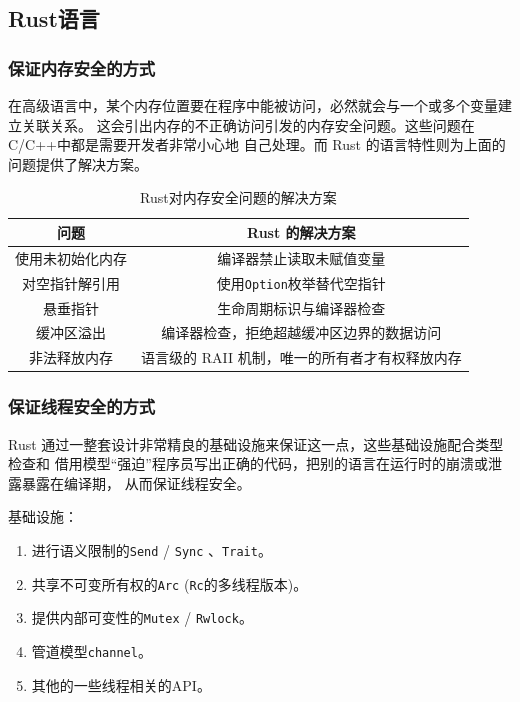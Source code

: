 \documentclass{../runikraft-report}
\begin{document}
\subsection{Rust语言}\vspace*{-4ex}
\subsubsection{保证内存安全的方式}
在高级语言中，某个内存位置要在程序中能被访问，必然就会与一个或多个变量建立关联关系。
这会引出内存的不正确访问引发的内存安全问题。这些问题在C/C++中都是需要开发者非常小心地
自己处理。而 Rust 的语言特性则为上面的问题提供了解决方案。\cite{bib:feasibility-8}
\begin{table}[H]
\centering
\caption{Rust对内存安全问题的解决方案}
\begin{tabular}{|c|c|}
\hline
\textbf{问题} & \textbf{Rust 的解决方案}\\\hline
使用未初始化内存&编译器禁止读取未赋值变量\\\hline
对空指针解引用&使用\texttt{Option}枚举替代空指针\\\hline
悬垂指针&生命周期标识与编译器检查\\\hline
缓冲区溢出&编译器检查，拒绝超越缓冲区边界的数据访问\\\hline
非法释放内存&语言级的 RAII 机制，唯一的所有者才有权释放内存\\\hline
\end{tabular}
\end{table}
\subsubsection{保证线程安全的方式}
Rust 通过一整套设计非常精良的基础设施来保证这一点，这些基础设施配合类型检查和
借用模型“强迫”程序员写出正确的代码，把别的语言在运行时的崩溃或泄露暴露在编译期，
从而保证线程安全。

\noindent 基础设施：

\begin{enumerate}
\item 进行语义限制的\texttt{Send} / \texttt{Sync} 、\texttt{Trait}。
\item 共享不可变所有权的\texttt{Arc} (\texttt{Rc}的多线程版本)。
\item 提供内部可变性的\texttt{Mutex} / \texttt{Rwlock}。
\item 管道模型\texttt{channel}。
\item 其他的一些线程相关的API。
\end{enumerate}
\end{document}

